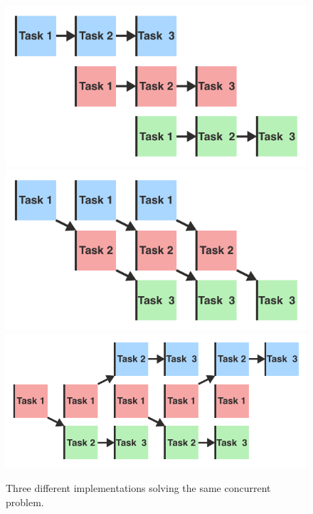 \begin{figure}[H]
    \centering
    \includegraphics[width=.48\textwidth]{figures/concurrency/concurrent_overlap.pdf}
    \includegraphics[width=.48\textwidth]{figures/concurrency/thread_per_task.pdf}
    \includegraphics[width=.6\textwidth]{figures/concurrency/distribute.pdf}
    \caption{Three different implementations solving the same concurrent problem.}
    \label{fig:concurrency_concurrent_overlap}
\end{figure}


